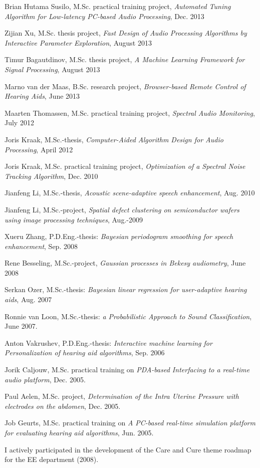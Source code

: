 \begin{items}
\item Brian Hutama Susilo, M.Sc. practical training project, \emph{Automated Tuning Algorithm for Low-latency PC-based Audio Processing}, Dec. 2013
\item Zijian Xu, M.Sc. thesis project, \emph{Fast Design of Audio Processing Algorithms by Interactive Parameter Exploration}, August 2013
\item Timur Bagautdinov, M.Sc. thesis project, \emph{A Machine Learning Framework for Signal Processing}, August 2013 
\item Marno van der Maas, B.Sc. research project, \emph{Browser-based Remote Control of Hearing Aids}, June 2013
\item Maarten Thomassen, M.Sc. practical training project, \emph{Spectral Audio Monitoring}, July 2012
\item Joris Kraak, M.Sc.-thesis, \emph{Computer-Aided Algorithm Design for Audio Processing}, April 2012
\item Joris Kraak, M.Sc. practical training project, \emph{Optimization of a Spectral 
Noise Tracking Algorithm}, Dec. 2010
\item Jianfeng Li, M.Sc.-thesis, \emph{Acoustic scene-adaptive speech enhancement}, Aug. 2010
\item Jianfeng Li, M.Sc.-project, \emph{Spatial defect clustering on semiconductor wafers using image processing techniques}, Aug.-2009
\item Xueru Zhang, P.D.Eng.-thesis: \emph{Bayesian periodogram smoothing for speech enhancement}, Sep. 2008
\item Rene Besseling, M.Sc.-project, \emph{Gaussian processes in Bekesy audiometry}, June 2008
\item Serkan Ozer, M.Sc.-thesis: \emph{Bayesian linear regression for user-adaptive hearing aids}, Aug. 2007
\item Ronnie van Loon, M.Sc.-thesis: \emph{a Probabilistic Approach to Sound Classification}, June 2007.
\item Anton Vakrushev, P.D.Eng.-thesis: \emph{Interactive machine learning for Personalization of hearing aid algorithms}, Sep. 2006
\item Jorik Caljouw, M.Sc. practical training on \emph{PDA-based Interfacing to a real-time audio platform}, Dec. 2005.
\item Paul Aelen, M.Sc. project, \emph{Determination of the Intra Uterine Pressure with electrodes on the abdomen}, Dec. 2005.
\item Job Geurts, M.Sc. practical training on \emph{A PC-based real-time simulation platform for evaluating hearing aid algorithms}, Jun. 2005.
\end{items}



I actively participated in the development of the Care and Cure theme roadmap for the EE department (2008).  